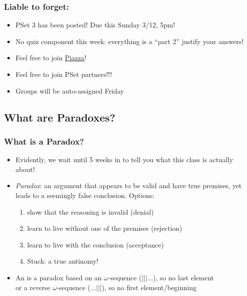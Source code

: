 \begin{frame}
\frametitle{Liable to forget:}

\begin{itemize}[<+->]

\item PSet 3 has been posted! Due this Sunday 3/12, 5pm!

\item[] No quiz component this week: everything is a ``part 2'' justify your answers!

\item Feel free to join \href{https://piazza.com/mit/spring2023/24118}{Piazza}! 

\item Feel free to join PSet partners!!! 
\item[] Groups will be auto-assigned Friday


\end{itemize}
\end{frame}

\subsection{What are Paradoxes?}

\begin{frame}
\frametitle{What is a Paradox?}

\begin{itemize}[<+->]
\item Evidently, we wait until 5 weeks in to tell you what this class is actually about!

\item \emph{Paradox}: an argument that appears to be valid and have true premises, yet leads to a seemingly false conclusion. Options:

\begin{enumerate}
\item show that the reasoning is invalid (denial) %
\item learn to live without one of the premises (rejection) %
\item learn to live with the conclusion (acceptance)
\item Stuck: a true antinomy! 

\end{enumerate}
\bigskip
\item An  is a paradox based on an $\omega$-sequence ($| | | \dots$), so no last element \\ or a reverse $\omega$-sequence ($\dots | | | $), so no first element/beginning

\end{itemize}
\end{frame}

